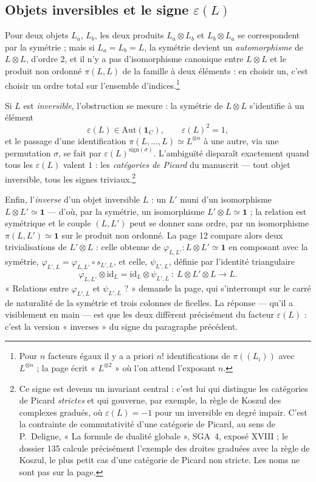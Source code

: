 \documentclass[11pt,a4paper]{article}
\begin{document}
\subsection*{Objets inversibles et le signe $\varepsilon(L)$}

Pour deux objets $L_a$, $L_b$, les deux produits $L_a \otimes L_b$ et
$L_b \otimes L_a$ se correspondent par la symétrie ; mais si
$L_a = L_b = L$, la symétrie devient un \emph{automorphisme} de
$L \otimes L$, d'ordre 2, et il n'y a pas d'isomorphisme canonique entre
$L \otimes L$ et le produit non ordonné $\pi(L, L)$ de la famille à deux
éléments : en choisir un, c'est choisir un ordre total sur l'ensemble
d'indices.\footnote{Pour $n$ facteurs égaux il y a a priori $n!$
identifications de $\pi((L_i))$ avec $L^{\otimes n}$ ; la page écrit
« $L^{\otimes 2}$ » où l'on attend l'exposant $n$.}

Si $L$ est \emph{inversible}, l'obstruction se mesure : la symétrie de
$L \otimes L$ s'identifie à un élément
\[
\varepsilon(L) \in \mathrm{Aut}(\mathbf{1}_C), \qquad \varepsilon(L)^2 = 1,
\]
et le passage d'une identification $\pi(L,\dots,L) \simeq L^{\otimes n}$ à
une autre, via une permutation $\sigma$, se fait par
$\varepsilon(L)^{\mathrm{sign}(\sigma)}$. L'ambiguïté disparaît exactement
quand tous les $\varepsilon(L)$ valent $1$ : les \emph{catégories de
Picard} du manuscrit — tout objet inversible, tous les signes
triviaux.\footnote{Ce signe est devenu un invariant central : c'est lui qui
distingue les catégories de Picard \emph{strictes} et qui gouverne, par
exemple, la règle de Koszul des complexes gradués, où
$\varepsilon(L) = -1$ pour un inversible en degré impair. C'est la contrainte
de commutativité d'une catégorie de Picard, au sens de P.~Deligne, « La
formule de dualité globale », SGA~4, exposé XVIII ; le dossier 135 calcule
précisément l'exemple des droites graduées avec la règle de Koszul, le plus
petit cas d'une catégorie de Picard non stricte. Les noms ne sont pas sur la
page.}

Enfin, l'\emph{inverse} d'un objet inversible $L$ : un $L'$ muni d'un
isomorphisme $L \otimes L' \simeq \mathbf{1}$ — d'où, par la symétrie, un
isomorphisme $L' \otimes L \simeq \mathbf{1}$ ; la relation est symétrique
et le couple $(L, L')$ peut se donner sans ordre, par un isomorphisme
$\pi(L, L') \simeq \mathbf{1}$ sur le produit non ordonné. La page 12
compare alors deux trivialisations de $L' \otimes L$ : celle obtenue de
$\varphi_{L,L'} : L \otimes L' \simeq \mathbf{1}$ en composant avec la
symétrie, $\varphi_{L',L} = \varphi_{L,L'} \circ s_{L',L}$, et celle,
$\psi_{L',L}$, définie par l'identité triangulaire
\[
\varphi_{L,L'} \otimes \mathrm{id}_L = \mathrm{id}_L \otimes \psi_{L',L}
\ :\ L \otimes L' \otimes L \longrightarrow L.
\]
« Relations entre $\varphi_{L',L}$ et $\psi_{L',L}$ ? » demande la page, qui s'interrompt sur le carré de naturalité de la symétrie et
trois colonnes de ficelles. La réponse — qu'il a visiblement en main —
est que les deux diffèrent précisément du facteur $\varepsilon(L)$ :
c'est la version « inverses » du signe du paragraphe précédent.
\end{document}
